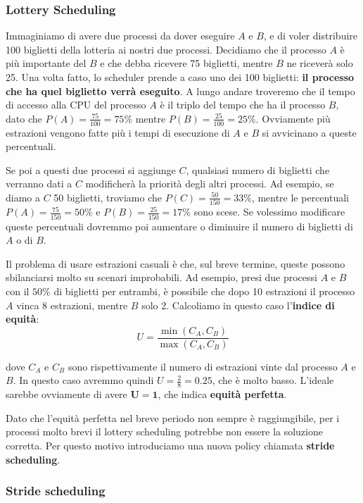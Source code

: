 \documentclass[11pt, a4paper, titlepage, oneside]{scrbook}
\begin{document}
\subsubsection{Lottery Scheduling}

Immaginiamo di avere due processi da dover eseguire $A$ e $B$, e di voler distribuire 100 biglietti della lotteria ai nostri due processi. Decidiamo che il processo $A$ è più importante del $B$ e che debba ricevere 75 biglietti, mentre $B$ ne riceverà solo 25. Una volta fatto, lo scheduler prende a caso uno dei 100 biglietti: \textbf{il processo che ha quel biglietto verrà eseguito}. A lungo andare troveremo che il tempo di accesso alla CPU del processo $A$ è il triplo del tempo che ha il processo $B$, dato che $P(A) = \frac{75}{100} = 75\%$ mentre $P(B) = \frac{25}{100} = 25\%$. Ovviamente più estrazioni vengono fatte più i tempi di esecuzione di $A$ e $B$ si avvicinano a queste percentuali.

Se poi a questi due processi si aggiunge $C$, qualsiasi numero di biglietti che verranno dati a $C$ modificherà la priorità degli altri processi. Ad esempio, se diamo a $C$ 50 biglietti, troviamo che $P(C) = \frac{50}{150} = 33\%$, mentre le percentuali $P(A) = \frac{75}{150} = 50\%$ e $P(B) = \frac{25}{150} = 17\%$ sono scese. Se volessimo modificare queste percentuali dovremmo poi aumentare o diminuire il numero di biglietti di $A$ o di $B$.

Il problema di usare estrazioni casuali è che, sul breve termine, queste possono sbilanciarsi molto su scenari improbabili. Ad esempio, presi due processi $A$ e $B$ con il $50\%$ di biglietti per entrambi, è possibile che dopo 10 estrazioni il processo $A$ vinca 8 estrazioni, mentre $B$ solo 2. Calcoliamo in questo caso l'\textbf{indice di equità}:
\[
U = \frac{\min(C_A, C_B)}{\max(C_A,C_B)}
\]

dove $C_A$ e $C_B$ sono rispettivamente il numero di estrazioni vinte dal processo $A$ e $B$. In questo caso avremmo quindi $U = \frac{2}{8} = 0.25$, che è molto basso. L'ideale sarebbe ovviamente di avere $\bm{U = 1}$, che indica \textbf{equità perfetta}.

Dato che l'equità perfetta nel breve periodo non sempre è raggiungibile, per i processi molto brevi il lottery scheduling potrebbe non essere la soluzione corretta. Per questo motivo introduciamo una nuova policy chiamata \textbf{stride scheduling}.

\subsubsection{Stride scheduling}
\end{document}
